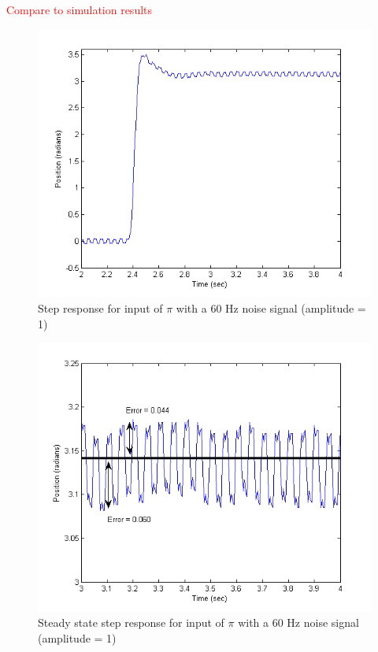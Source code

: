 \documentclass{article}
\newcommand{\xxx}[1]{\textcolor{red}{#1}}
\theoremstyle{plain}
\theoremstyle{definition}
\theoremstyle{remark}
\begin{document}
\xxx{Compare to simulation results}

\begin{figure}[htb]
\begin{center}
\includegraphics[width = 12cm]{PosNoise.png}
\caption{Step response for input of $\pi$ with a 60 Hz noise signal (amplitude = 1)}
\label{PosNoise}
\end{center}
\end{figure}

\begin{figure}[htb]
\begin{center}
\includegraphics[width = 12cm]{PosNoiseZoom.png}
\caption{Steady state step response for input of $\pi$ with a 60 Hz noise signal (amplitude = 1)}
\label{PosNoiseZoom}
\end{center}
\end{figure}
\end{document}
